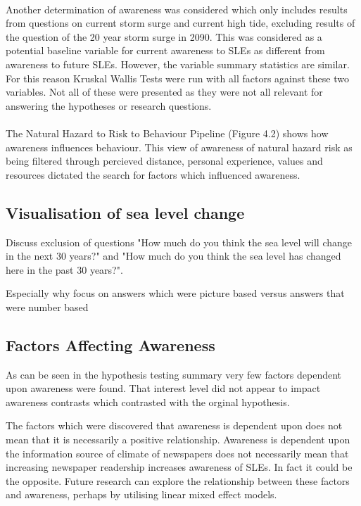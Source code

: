 \paragraph{}
Another determination of awareness was considered which only includes results from questions on current storm surge and current high tide, excluding results of the question of the 20 year storm surge in 2090. This was considered as a potential baseline variable for current awareness to SLEs as different from awareness to future SLEs. However, the variable summary statistics are similar. For this reason Kruskal Wallis Tests were run with all factors against these two variables. Not all of these were presented as they were not all relevant for answering the hypotheses or research questions. 

\paragraph{}
The Natural Hazard to Risk to Behaviour Pipeline (Figure 4.2) shows how awareness influences behaviour. This view of awareness of natural hazard risk as being filtered through percieved distance, personal experience, values and resources dictated the search for factors which influenced awareness. 


\subsection{Visualisation of sea level change}
Discuss exclusion of questions "How much do you think the sea level will change in the next 30 years?" and "How much do you think the sea level has changed here in the past 30 years?". 

Especially why focus on answers which were picture based versus answers that were number based



\subsection{Factors Affecting Awareness}
As can be seen in the hypothesis testing summary very few factors dependent upon awareness were found. That interest level did not appear to impact awareness contrasts which contrasted with the orginal hypothesis.


The factors which were discovered that awareness is dependent upon does not mean that it is necessarily a positive relationship. Awareness is dependent upon the information source of climate of newspapers does not necessarily mean that increasing newspaper readership increases awareness of SLEs. In fact it could be the opposite. Future research can explore the relationship between these factors and awareness, perhaps by utilising linear mixed effect models.

